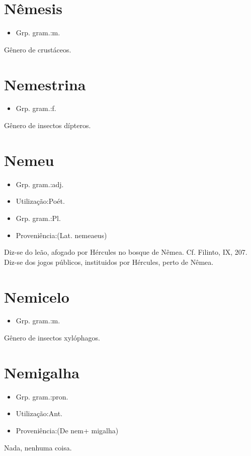 \section{Nêmesis}
\begin{itemize}
\item {Grp. gram.:m.}
\end{itemize}
Gênero de crustáceos.
\section{Nemestrina}
\begin{itemize}
\item {Grp. gram.:f.}
\end{itemize}
Gênero de insectos dípteros.
\section{Nemeu}
\begin{itemize}
\item {Grp. gram.:adj.}
\end{itemize}
\begin{itemize}
\item {Utilização:Poét.}
\end{itemize}
\begin{itemize}
\item {Grp. gram.:Pl.}
\end{itemize}
\begin{itemize}
\item {Proveniência:(Lat. \textunderscore nemeaeus\textunderscore )}
\end{itemize}
Diz-se do leão, afogado por Hércules no bosque de Nêmea. Cf. Filinto, IX, 207.
Diz-se dos jogos públicos, instituidos por Hércules, perto de Nêmea.
\section{Nemicelo}
\begin{itemize}
\item {Grp. gram.:m.}
\end{itemize}
Gênero de insectos xylóphagos.
\section{Nemigalha}
\begin{itemize}
\item {Grp. gram.:pron.}
\end{itemize}
\begin{itemize}
\item {Utilização:Ant.}
\end{itemize}
\begin{itemize}
\item {Proveniência:(De \textunderscore nem\textunderscore  + \textunderscore migalha\textunderscore )}
\end{itemize}
Nada, nenhuma coisa.
